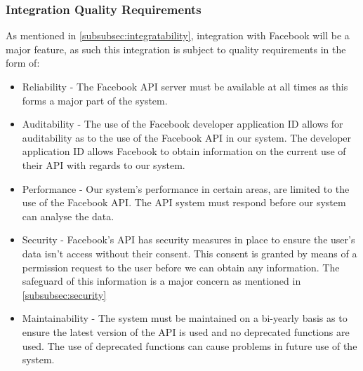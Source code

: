 \documentclass{article}
\begin{document}
		\subsubsection{Integration Quality Requirements}
		As mentioned in \ref{subsubsec:integratability}, integration with Facebook will be a major feature, as such this integration is subject to quality requirements in the form of:
		\begin{itemize}
			\item Reliability - The Facebook API server must be available at all times as this forms a major part of the system.
			\item Auditability - The use of the Facebook developer application ID allows for auditability as to the use of the Facebook API in our system. The developer application ID allows Facebook to obtain information on the current use of their API with regards to our system.
			\item Performance - Our system's performance in certain areas, are limited to the use of the Facebook API. The API system must respond before our system can analyse the data.
			\item Security - Facebook's API has security measures in place to ensure the user's data isn't access without their consent. This consent is granted by means of a permission request to the user before we can obtain any information. The safeguard of this information is a major concern as mentioned in \ref{subsubsec:security}
			\item Maintainability - The system must be maintained on a bi-yearly basis as to ensure the latest version of the API is used and no deprecated functions are used. The use of deprecated functions can cause problems in future use of the system.
		\end{itemize}

	
\end{document}
